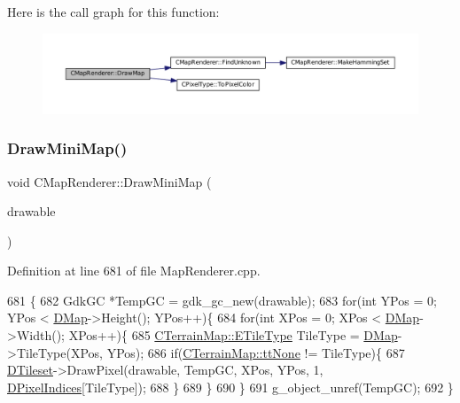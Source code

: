 Here is the call graph for this function\+:\nopagebreak
\begin{figure}[H]
\begin{center}
\leavevmode
\includegraphics[width=350pt]{classCMapRenderer_a26786befd5d6d0b09210736916d1b912_cgraph}
\end{center}
\end{figure}
\hypertarget{classCMapRenderer_ae5c68b6a4892eb8b9e7a4d8afb4e344e}{}\label{classCMapRenderer_ae5c68b6a4892eb8b9e7a4d8afb4e344e} 
\subsubsection{\texorpdfstring{Draw\+Mini\+Map()}{DrawMiniMap()}}
{\footnotesize\ttfamily void C\+Map\+Renderer\+::\+Draw\+Mini\+Map (\begin{DoxyParamCaption}\item[{Gdk\+Drawable $\ast$}]{drawable }\end{DoxyParamCaption})}



Definition at line 681 of file Map\+Renderer.\+cpp.


\begin{DoxyCode}
681                                                    \{
682     GdkGC *TempGC = gdk\_gc\_new(drawable);
683     \textcolor{keywordflow}{for}(\textcolor{keywordtype}{int} YPos = 0; YPos < \hyperlink{classCMapRenderer_ab9a199c61aa1c87a3248af3085d8ba52}{DMap}->Height(); YPos++)\{
684         \textcolor{keywordflow}{for}(\textcolor{keywordtype}{int} XPos = 0; XPos < \hyperlink{classCMapRenderer_ab9a199c61aa1c87a3248af3085d8ba52}{DMap}->Width(); XPos++)\{
685             \hyperlink{classCTerrainMap_aff2ab991e237269941416dd79d8871d4}{CTerrainMap::ETileType} TileType = \hyperlink{classCMapRenderer_ab9a199c61aa1c87a3248af3085d8ba52}{DMap}->TileType(XPos, YPos);
686             \textcolor{keywordflow}{if}(\hyperlink{classCTerrainMap_aff2ab991e237269941416dd79d8871d4a481e779132fb16414d17870bd6229eb5}{CTerrainMap::ttNone} != TileType)\{
687                 \hyperlink{classCMapRenderer_ace0648cba050b5e02431096edd15b836}{DTileset}->DrawPixel(drawable, TempGC, XPos, YPos, 1, 
      \hyperlink{classCMapRenderer_af636936c20248c3ee6cb6ec46f18f077}{DPixelIndices}[TileType]);
688             \}
689         \}
690     \}
691     g\_object\_unref(TempGC);
692 \}
\end{DoxyCode}
\hypertarget{classCMapRenderer_aec3c1d3294ac3af8ebb717ed5be88870}{}\label{classCMapRenderer_aec3c1d3294ac3af8ebb717ed5be88870} 
